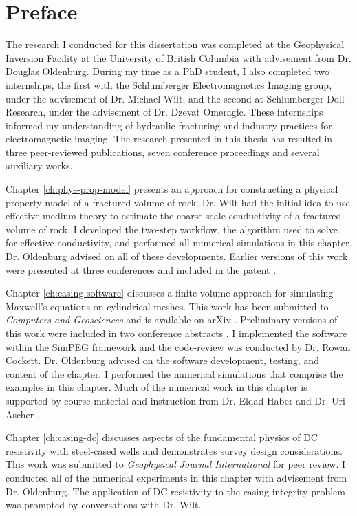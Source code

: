 
\chapter{Preface}

The research I conducted for this dissertation was completed at the Geophysical Inversion Facility at the University of British Columbia with advisement from Dr. Douglas Oldenburg. During my time as a PhD student, I also completed two internships, the first with the Schlumberger Electromagnetics Imaging group, under the advisement of Dr. Michael Wilt, and the second at Schlumberger Doll Research, under the advisement of Dr. Dzevat Omeragic. These internships informed my understanding of hydraulic fracturing and industry practices for electromagnetic imaging. The research presented in this thesis has resulted in three peer-reviewed publications, seven conference proceedings and several auxiliary works.

Chapter \ref{ch:phys-prop-model} presents an approach for constructing a physical property
model of a fractured volume of rock. Dr. Wilt had the initial idea to use effective medium theory to estimate the coarse-scale conductivity of a fractured volume of rock. I developed the two-step workflow, the algorithm used to solve for effective conductivity, and performed all numerical simulations in this chapter. Dr. Oldenburg advised on all of these developments. Earlier versions of this work were presented at three conferences \citep{Heagy2013, Heagy2014, Wilt2014} and included in the patent \cite{Wilt2015}.

Chapter \ref{ch:casing-software} discusses a finite volume approach for simulating Maxwell’s equations on cylindrical meshes. This work has been submitted to \emph{Computers and Geosciences} and is available on arXiv \citep{Heagy2018a}. Preliminary versions of this work were included in two conference abstracts \citep{Heagy2015, Heagy2017a}. I implemented the software within the SimPEG framework and the code-review was conducted by Dr. Rowan Cockett. Dr. Oldenburg advised on the software development, testing, and content of the chapter. I performed the numerical simulations that comprise the examples in this chapter. Much of the numerical work in this chapter is supported by course material and instruction from Dr. Eldad Haber and Dr. Uri Ascher \citep{Haber2014, Ascher2008}.

Chapter \ref{ch:casing-dc} discusses aspects of the fundamental physics of DC resistivity with steel-cased wells and demonstrates survey design considerations. This work was submitted to \emph{Geophysical Journal International} for peer review. I conducted all of the numerical experiments in this chapter with advisement from Dr. Oldenburg. The application of DC resistivity to the casing integrity problem was prompted by conversations with Dr. Wilt.

